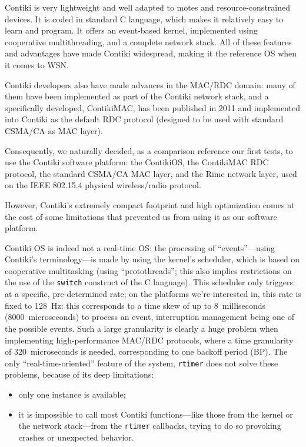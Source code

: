 \documentclass[conference]{IEEEtran}
\begin{document}
Contiki is very lightweight and well adapted to motes and
resource-constrained devices. It is coded in standard C language, which
makes it relatively easy to learn and program. It offers an event-based
kernel, implemented using cooperative multithreading, and a complete
network stack. All of these features and advantages have made
Contiki widespread, making it the reference OS when it comes to WSN.

Contiki developers also have made advances in the MAC/RDC domain: many
of them have been implemented as part of the Contiki network stack, and
a specifically developed, ContikiMAC, has been published in 2011
\cite{ContikiMAC} and implemented into Contiki as the default
RDC protocol (designed to be used with standard CSMA/CA as MAC layer).

Consequently, we naturally decided, as a comparison reference our first tests,
to use the Contiki software platform: the ContikiOS, the ContikiMAC RDC
protocol, the standard CSMA/CA MAC layer, and the Rime network layer, used
on the IEEE 802.15.4 physical wireless/radio protocol.

\bigskip

However, Contiki's extremely compact footprint and high optimization comes
at the cost of some limitations that prevented us from using it as our
software platform.

Contiki OS is indeed not a real-time OS: the processing of ``events''---using
Contiki's terminology---is made by using the kernel's scheduler, which is
based on cooperative multitasking (using ``protothreads''; this also implies
restrictions on the use of the \texttt{switch} construct of the C language).
This scheduler only triggers at a specific, pre-determined rate; on
the platforms we're interested in, this rate is fixed to 128~Hz:
this corresponds to a time skew of up to 8~milliseconds
(8000~microseconds) to process an event, interruption management being
one of the possible events. Such a large granularity is clearly
a huge problem when implementing high-performance MAC/RDC protocols,
where a time granularity of 320~microseconds is needed, corresponding
to one backoff period (BP). The only ``real-time-oriented'' feature
of the system, \texttt{rtimer} does not solve these problems, because
of its deep limitations:
\begin{itemize}
\item only one instance is available;
\item it is impossible to call most Contiki functions---like those from
the kernel or the network stack---from the \texttt{rtimer} callbacks,
trying to do so provoking crashes or unexpected behavior.
\end{itemize}
\end{document}
